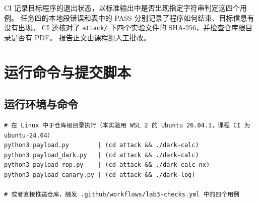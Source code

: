 \documentclass[UTF8,a4paper,12pt,fontset=windows]{ctexart}
\newcommand{\code}[1]{\texttt{#1}}
\begin{document}
CI 记录目标程序的退出状态，以标准输出中是否出现指定字符串判定这四个用例。
任务四的本地段错误和表中的 PASS 分别记录了程序如何结束、目标信息有没有出现。
CI 还核对了 \code{attack/} 下四个实验文件的 SHA-256，并检查仓库根目录是否有 PDF。
报告正文由课程组人工批改。

\appendix
\section{运行命令与提交脚本}

\subsection{运行环境与命令}
\begin{lstlisting}
# 在 Linux 中于仓库根目录执行（本实验用 WSL 2 的 Ubuntu 26.04.1，课程 CI 为 ubuntu-24.04）
python3 payload.py        | (cd attack && ./dark-calc)
python3 payload_dark.py   | (cd attack && ./dark-calc)
python3 payload_rop.py    | (cd attack && ./dark-calc-nx)
python3 payload_canary.py | (cd attack && ./dark-log)

# 或者直接推送仓库，触发 .github/workflows/lab3-checks.yml 中的四个用例
\end{lstlisting}

\clearpage
\enlargethispage{1.5\baselineskip}
\end{document}
